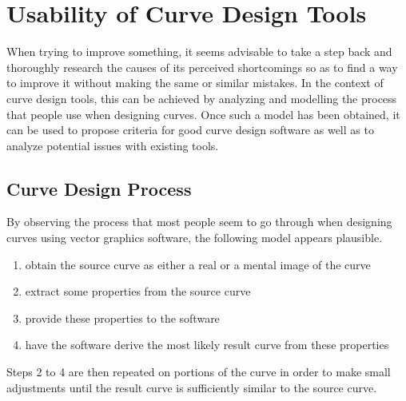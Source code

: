 \documentclass[a4paper]{article}
\begin{document}

	\section{Usability of Curve Design Tools}
	\label{section:usability_curve_design_tools}

		When trying to improve something, it seems advisable to take a step back and thoroughly research the causes of its perceived shortcomings so as to find a way to improve it without making the same or similar mistakes. In the context of curve design tools, this can be achieved by analyzing and modelling the process that people use when designing curves. Once such a model has been obtained, it can be used to propose criteria for good curve design software as well as to analyze potential issues with existing tools.

		\subsection{Curve Design Process}
		\label{section:curve_design_process}

			By observing the process that most people seem to go through when designing curves using vector graphics software, the following model appears plausible.

			\begin{enumerate}
				\item obtain the source curve as either a real or a mental image of the curve
				\item extract some properties from the source curve
				\item provide these properties to the software
				\item have the software derive the most likely result curve from these properties
			\end{enumerate}

			Steps 2 to 4 are then repeated on portions of the curve in order to make small adjustments until the result curve is sufficiently similar to the source curve.
\end{document}
